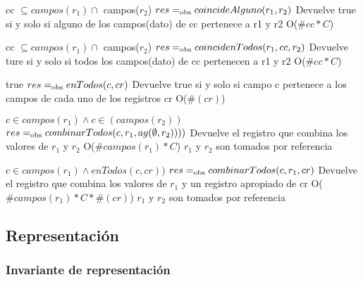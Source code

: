  

 {cc $\subseteq campos(r_1)\cap$ campos($r_2$)}
 {$res =_{\mathrm{obs}} coincideAlguno(r_1, r_2)$}
 {Devuelve true si y solo si alguno de los campos(dato) de cc pertenece a r1 y r2}
 {O($\#cc*C$)}
 {}
 
 {cc $\subseteq campos(r_1) \cap$ campos($r_2$)}
 {$res =_{\mathrm{obs}} coincidenTodos(r_1, cc, r_2) $}
 {Devuelve ture si y solo si todos los campos(dato) de cc pertenecen a r1 y r2}
 {O($\#cc*C$) } 
 {}
 
 {true}
 {$res =_{\mathrm{obs}} enTodos(c,cr)$}
 {Devuelve true si y solo si campo c pertenece a los campos de cada uno de los registros cr}
 {O($\#(cr)$)}
 {}

{$c \in campos(r_1) \land c \in (campos(r_2))$}
{$res =_{\mathrm{obs}} combinarTodos(c,r_1,ag( \emptyset , r_2))) )$}
{Devuelve el registro que combina los valores de $r_1$ y $r_2$ }
{O($\#campos(r_1)*C$)}
{$r_1$ y $r_2$ son tomados por referencia}

{$c \in campos(r_1) \land enTodos(c,cr))$}
{$res =_{\mathrm{obs}} combinarTodos(c,r_1, cr)$}
{Devuelve el registro que combina los valores de $r_1$ y un registro apropiado de cr}
{O($\#campos(r_1)*C *\#(cr)$)}
{$r_1$ y $r_2$ son tomados por referencia}



\subsection{Representación}



\subsubsection*{Invariante de representación}



